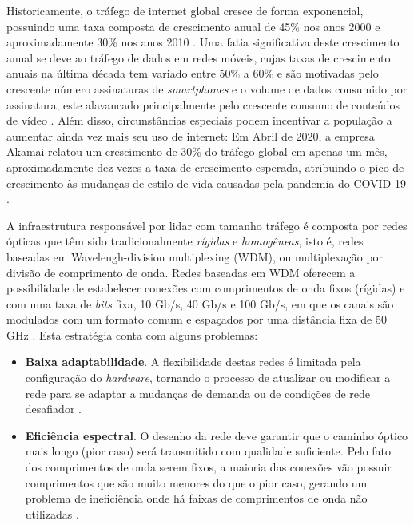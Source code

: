 

Historicamente, o tráfego de internet global cresce de forma exponencial, possuindo uma taxa composta de crescimento anual de 45\% nos anos 2000 \cite{network_evolution_2020} e aproximadamente 30\% nos anos 2010 \cite{cisco2011cisco, cisco2012cisco, cisco2013cisco, cisco2014cisco, cisco2015cisco, cisco2016cisco, cisco2017cisco, cisco2018cisco}. Uma fatia significativa deste crescimento anual se deve ao tráfego de dados em redes móveis, cujas taxas de crescimento anuais na última década tem variado entre 50\% a 60\% e são motivadas pelo crescente número assinaturas de \textit{smartphones} e o volume de dados consumido por assinatura, este alavancado principalmente pelo crescente consumo de conteúdos de vídeo \cite{ericsson_mobility_report_2020}. Além disso, circunstâncias especiais podem incentivar a população a aumentar ainda vez mais seu uso de internet: Em Abril de 2020, a empresa Akamai relatou um crescimento de 30\% do tráfego global em apenas um mês, aproximadamente dez vezes a taxa de crescimento esperada, atribuindo o pico de crescimento às mudanças de estilo de vida causadas pela pandemia do COVID-19 \cite{mckeay_2020}.

A infraestrutura responsável por lidar com tamanho tráfego é composta por redes ópticas que têm sido tradicionalmente \textit{rígidas} e \textit{homogêneas}, isto é, redes baseadas em Wavelengh-division multiplexing (WDM), ou  multiplexação por divisão de comprimento de onda. Redes baseadas em WDM oferecem a possibilidade de estabelecer conexões com comprimentos de onda fixos (rígidas) e com uma taxa de \textit{bits} fixa, 10 Gb/s, 40 Gb/s e 100 Gb/s, em que os canais são modulados com um formato comum e espaçados por uma distância fixa de 50 GHz \cite{eon_tutorial_2014, jinno_eon_benefits}. Esta estratégia conta com alguns problemas:

\begin{itemize}
  \item \textbf{Baixa adaptabilidade}. A flexibilidade destas redes é limitada pela configuração do \textit{hardware}, tornando o processo de atualizar ou modificar a rede para se adaptar a mudanças de demanda ou de condições de rede desafiador \cite{eon_tutorial_2014}.
  \item \textbf{Eficiência espectral}. O desenho da rede deve garantir que o caminho óptico mais longo (pior caso) será transmitido com qualidade suficiente. Pelo fato dos comprimentos de onda serem fixos, a maioria das conexões vão possuir comprimentos que são muito menores do que o pior caso, gerando um problema de ineficiência onde há faixas de comprimentos de onda não utilizadas \cite{jinno_eon_benefits,vizcaino_eon_energy}.
\end{itemize}

